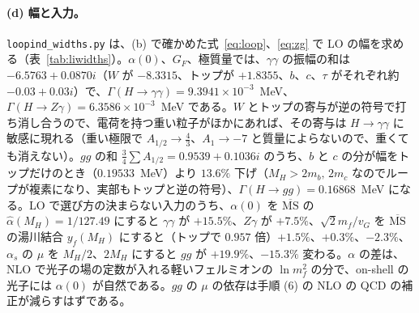 \documentclass[a4paper,10pt]{ltjsarticle}
\newcommand{\MSbar}{\overline{\mathrm{MS}}}
\begin{document}
\paragraph{(d) 幅と入力。}\texttt{loopind\_widths.py} は、(b) で確かめた式~\eqref{eq:loop}、\eqref{eq:zg} で LO の幅を求める（表~\ref{tab:liwidths}）。$\alpha(0)$、$G_F$、極質量では、$\gamma\gamma$ の振幅の和は $-6.5763+0.0870i$（$W$ が $-8.3315$、トップが $+1.8355$、$b$、$c$、$\tau$ がそれぞれ約 $-0.03+0.03i$）で、$\Gamma(H\to\gamma\gamma)=9.3941\times10^{-3}$~MeV、$\Gamma(H\to Z\gamma)=6.3586\times10^{-3}$~MeV である。$W$ とトップの寄与が逆の符号で打ち消し合うので、電荷を持つ重い粒子がほかにあれば、その寄与は $H\to\gamma\gamma$ に敏感に現れる（重い極限で $A_{1/2}\to\frac43$、$A_1\to-7$ と質量によらないので、重くても消えない）。$gg$ の和 $\frac34\sum A_{1/2}=0.9539+0.1036i$ のうち、$b$ と $c$ の分が幅をトップだけのとき（$0.19533$~MeV）より $13.6\%$ 下げ（$M_H>2m_b,\,2m_c$ なのでループが複素になり、実部もトップと逆の符号）、$\Gamma(H\to gg)=0.16868$~MeV になる。LO で選び方の決まらない入力のうち、$\alpha(0)$ を $\MSbar$ の $\hat\alpha(M_H)=1/127.49$ にすると $\gamma\gamma$ が $+15.5\%$、$Z\gamma$ が $+7.5\%$、$\sqrt2m_f/v_G$ を $\MSbar$ の湯川結合 $y_f(M_H)$ にすると（トップで $0.957$ 倍）$+1.5\%$、$+0.3\%$、$-2.3\%$、$\alpha_s$ の $\mu$ を $M_H/2$、$2M_H$ にすると $gg$ が $+19.9\%$、$-15.3\%$ 変わる。$\alpha$ の差は、NLO で光子の場の定数が入れる軽いフェルミオンの $\ln m_f^2$ の分で、on-shell の光子には $\alpha(0)$ が自然である。$gg$ の $\mu$ の依存は手順 (6) の NLO の QCD の補正が減らすはずである。
\end{document}
